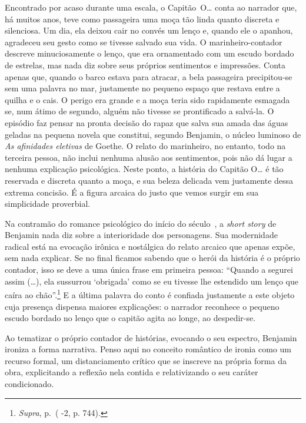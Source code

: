 Encontrado por acaso durante uma escala, o Capitão~O\ldots{} conta ao
narrador que, há muitos anos, teve como passageira uma moça tão linda
quanto discreta e silenciosa. Um dia, ela deixou cair no convés um lenço
e, quando ele o apanhou, agradeceu seu gesto como se tivesse salvado sua
vida. O marinheiro-contador descreve minuciosamente o lenço, que era
ornamentado com um escudo bordado de estrelas, mas nada diz sobre seus
próprios sentimentos e impressões. Conta apenas que, quando o barco
estava para atracar, a bela passageira precipitou-se sem uma palavra no
mar, justamente no pequeno espaço que restava entre a quilha e o cais. O
perigo era grande e a moça teria sido rapidamente esmagada se, num átimo
de segundo, alguém não tivesse se prontificado a salvá-la. O episódio
faz pensar na pronta decisão do rapaz que salva sua amada das águas
geladas na pequena novela que constitui, segundo Benjamin, o núcleo
luminoso de \emph{As afinidades eletivas} de Goethe. O relato do
marinheiro, no entanto, todo na terceira pessoa, não inclui nenhuma
alusão aos sentimentos, pois não dá lugar a nenhuma explicação
psicológica. Neste ponto, a história do Capitão O\ldots{} é tão reservada e
discreta quanto a moça, e sua beleza delicada vem justamente dessa
extrema concisão. É a figura arcaica do justo que vemos surgir em sua
simplicidade proverbial.

Na contramão do romance psicológico do início do século~, a
\emph{short story} de Benjamin nada diz sobre a interioridade dos
personagens. Sua modernidade radical está na evocação irônica e
nostálgica do relato arcaico que apenas expõe, sem nada explicar. Se no
final ficamos sabendo que o herói da história é o próprio contador, isso
se deve a uma única frase em primeira pessoa: ``Quando a segurei assim
(\ldots{}), ela sussurrou `obrigada' como se eu tivesse lhe estendido um
lenço que caíra ao chão''.\footnote{\emph{Supra}, p.\,\pageref{supra9} ( -2, p. 744).}
E a última palavra do conto é confiada justamente a este objeto cuja
presença dispensa maiores explicações: o narrador reconhece o pequeno
escudo bordado no lenço que o capitão agita ao longe, ao despedir-se.

Ao tematizar o próprio contador de histórias, evocando o seu espectro,
Benjamin ironiza a forma narrativa. Penso aqui no conceito romântico de
ironia como um recurso formal, um distanciamento crítico que se inscreve
na própria forma da obra, explicitando a reflexão nela contida e
relativizando o seu caráter condicionado.


